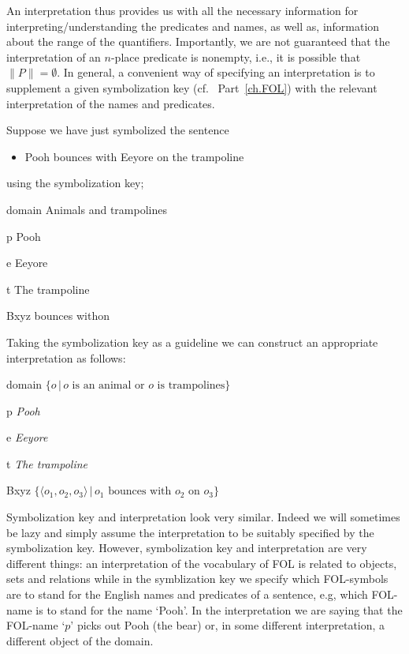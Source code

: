 An interpretation thus provides us with all the necessary information for interpreting/understanding the predicates and names, as well as, information about the range of the quantifiers. Importantly, we are not guaranteed that the interpretation of an $n$-place predicate is nonempty, i.e., it is possible that $\|P\|=\emptyset$. In general, a convenient way of specifying an interpretation is to supplement a given symbolization key (cf.~ Part~\ref{ch.FOL}) with the relevant interpretation of the names and predicates.

Suppose we have just symbolized the sentence
\begin{itemize}
\item Pooh bounces with Eeyore on the trampoline
\end{itemize}
using the symbolization key;
\begin{ekey}
\item[domain]Animals and trampolines
\item[p]Pooh
\item[e]Eeyore
\item[t]The trampoline
\item[Bxyz]bounces withon
\end{ekey}
Taking the symbolization key as a guideline we can construct an appropriate interpretation as follows:
\begin{ekey}
\item[domain]$\{o\,|\,o\text{ is an animal or }o\text{ is trampolines}\}$
\item[p]\emph{Pooh}
\item[e]\emph{Eeyore}
\item[t]\emph{The trampoline}
\item[Bxyz]$\{\langle o_1,o_2,o_3\rangle\,|\,o_1\text{ bounces with }o_2\text{ on }o_3\}$
\end{ekey}
Symbolization key and interpretation look very similar. Indeed we will sometimes be lazy and simply assume the interpretation to be suitably specified by the symbolization key. However, symbolization key and interpretation are very different things: an interpretation of the vocabulary of FOL is related to objects, sets and relations while in the symblization key we specify which FOL-symbols are to stand for the English names and predicates of a sentence, e.g, which FOL-name is to stand for the name `Pooh'. In the interpretation we are saying that the FOL-name `$p$' picks out Pooh (the bear) or, in some different interpretation, a different object of the domain. 

